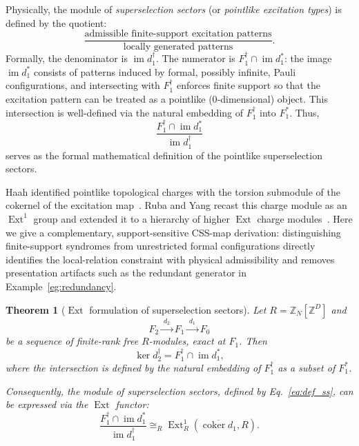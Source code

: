 \documentclass[aps,prx,english,superscriptaddress,twocolumn,tightenlines,showpacs,longbibliography,floatfix,amsfonts]{revtex4-2}
\newtheorem{theorem}{Theorem}
\theoremstyle{remark}
\theoremstyle{definition}
\begin{document}
Physically, the module of \textit{superselection sectors} (or \textit{pointlike excitation types}) is defined by the quotient:
\begin{equation}
	\frac{\text{admissible finite-support excitation patterns}}{\text{locally generated patterns}}.
\end{equation}
Formally, the denominator is $\operatorname{im} d_1^\dagger$. The numerator is $F_1^\dagger\cap \operatorname{im} d_1^*$: the image $\operatorname{im} d_1^*$ consists of patterns induced by formal, possibly infinite, Pauli configurations, and intersecting with $F_1^\dagger$ enforces finite support so that the excitation pattern can be treated as a pointlike (0‑dimensional) object. This intersection is well-defined via the natural embedding of $F_1^\dagger$ into $F_1^*$. Thus,
\begin{equation}
	\frac{F_1^\dagger\cap \operatorname{im} d_1^*}{\operatorname{im} d_1^\dagger} \label{eq:def_ss}
\end{equation}
serves as the formal mathematical definition of the pointlike superselection sectors.

Haah identified pointlike topological charges with the torsion submodule of
the cokernel of the excitation map~\cite{Haah2013}. Ruba and Yang recast this
charge module as an \(\operatorname{Ext}^1\) group and extended it to a
hierarchy of higher \(\operatorname{Ext}\) charge modules~\cite{Yang2023}.
Here we give a complementary, support-sensitive CSS-map derivation:
distinguishing finite-support syndromes from unrestricted formal configurations
directly identifies the local-relation constraint with physical admissibility
and removes presentation artifacts such as the redundant generator in
Example~\ref{eg:redundancy}.

\begin{theorem}[$\operatorname{Ext}$ formulation of superselection sectors]
	\label{thm:superselection}
	Let $R=\mathbb{Z}_N[\mathbb{Z}^D]$
	and
	\begin{equation*}
		F_2\xrightarrow{\;d_2\;}F_1\xrightarrow{\;d_1\;}F_0
	\end{equation*}
	be a sequence of finite-rank free $R$-modules, exact at $F_1$. Then
	\begin{equation}
		\ker d_2^\dagger = F_1^\dagger\cap \operatorname{im} d_1^*,
		\label{eq:ker_d2}
	\end{equation}
	where the intersection is defined by the natural embedding of $F_1^\dagger$ as a subset of $F_1^*$.

	Consequently, the module of superselection sectors, defined by Eq.~\eqref{eq:def_ss}, can be expressed via the $\operatorname{Ext}$ functor:
	\begin{equation}
		\frac{F_1^\dagger\cap \operatorname{im} d_1^*}{\operatorname{im} d_1^\dagger} \cong_R \operatorname{Ext}_R^1(\overline{\operatorname{coker}d_1},R).
		\label{eq:Ext1-semi-infinite}
	\end{equation}
\end{theorem}
\end{document}
